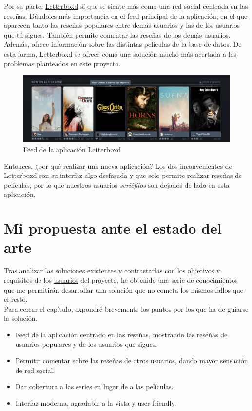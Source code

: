Por su parte, \href{https://letterboxd.com}{Letterboxd} sí que se siente más como una red social centrada en las
reseñas. Dándoles más importancia en el feed principal de la aplicación, en el que aparecen tanto las reseñas populares
entre demás usuarios y las de los usuarios que tú sigues. También permite comentar las reseñas de los demás usuarios.
Además, ofrece información sobre las distintas películas de la base de datos. De esta forma, Letterboxd se ofrece como
una solución mucho más acertada a los problemas planteados en este proyecto.\\
\begin{figure}[H]
    \centering	
    \includegraphics[scale=0.4]{img/letterboxd-feed.png}
    \caption{ Feed de la aplicación Letterboxd }\label{fig:letterboxd}
\end{figure}

Entonces, ¿por qué realizar una nueva aplicación? Los dos inconvenientes de Letterboxd son su interfaz algo desfasada
y que solo permite realizar reseñas de películas, por lo que nuestros usuarios \textit{seriéfilos} son dejados de lado
en esta aplicación.\\

\section{Mi propuesta ante el estado del arte}

Tras analizar las soluciones existentes y contrastarlas con los \hyperref[sec:objetivo]{objetivos} y requisitos de los
\hyperref[chap:personas]{usuarios} del proyecto, he obtenido una serie de conocimientos que me permitirán desarrollar
una solución que no cometa los mismos fallos que el resto. \\

Para cerrar el capítulo, expondré brevemente los puntos por los que ha de guiarse la solución. 
\begin{itemize}
    \item Feed de la aplicación centrado en las reseñas, mostrando las reseñas de usuarios populares y de los usuarios
    que sigues.
    \item Permitir comentar sobre las reseñas de otros usuarios, dando mayor sensación de red social.
    \item Dar cobertura a las series en lugar de a las películas.
    \item Interfaz moderna, agradable a la vista y user-friendly.
\end{itemize}
